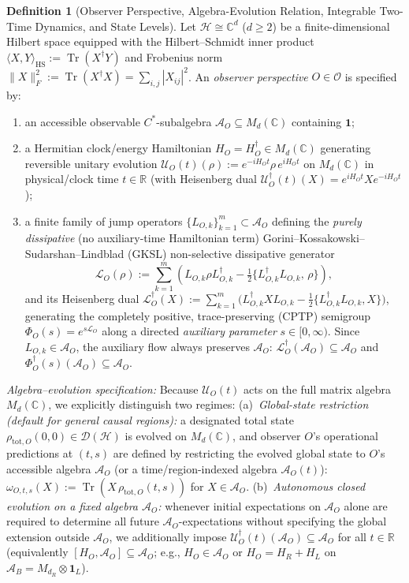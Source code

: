 \documentclass[11pt,a4paper]{article}
\theoremstyle{definition}
\newtheorem{definition}{Definition}
\theoremstyle{remark}
\newcommand{\Tr}{\operatorname{Tr}}
\newcommand{\cH}{\mathcal{H}}
\newcommand{\cA}{\mathcal{A}}
\newcommand{\cD}{\mathcal{D}}
\newcommand{\cL}{\mathcal{L}}
\newcommand{\cU}{\mathcal{U}}
\newcommand{\bbC}{\mathbb{C}}
\newcommand{\bbR}{\mathbb{R}}
\newcommand{\1}{\mathbf{1}}
\newcommand{\normF}[1]{\|#1\|_F}
\begin{document}
\begin{definition}[Observer Perspective, Algebra-Evolution Relation, Integrable Two-Time Dynamics, and State Levels]\label{def:ostqd}
Let $\cH \cong \bbC^d$ ($d \ge 2$) be a finite-dimensional Hilbert space equipped with the Hilbert--Schmidt inner product $\langle X, Y\rangle_{\mathrm{HS}} := \Tr(X^\dagger Y)$ and Frobenius norm $\normF{X}^2 := \Tr(X^\dagger X) = \sum_{i,j}|X_{ij}|^2$. An \emph{observer perspective} $O \in \mathcal{O}$ is specified by:
\begin{enumerate}
  \item an accessible observable $C^*$-subalgebra $\cA_O \subseteq M_d(\bbC)$ containing $\1$;
  \item a Hermitian clock/energy Hamiltonian $H_O = H_O^\dagger \in M_d(\bbC)$ generating reversible unitary evolution $\cU_O(t)(\rho) := e^{-iH_O t}\rho\, e^{iH_O t}$ on $M_d(\bbC)$ in physical/clock time $t \in \bbR$ (with Heisenberg dual $\cU_O^\dagger(t)(X) = e^{iH_O t} X e^{-iH_O t}$);
  \item a finite family of jump operators $\{L_{O,k}\}_{k=1}^m \subset \cA_O$ defining the \emph{purely dissipative} (no auxiliary-time Hamiltonian term) Gorini--Kossakowski--Sudarshan--Lindblad (GKSL) \cite{Lindblad1976,GKS1976} non-selective dissipative generator
  \begin{equation}\label{eq:gksl}
    \cL_O(\rho) := \sum_{k=1}^m \left(L_{O,k}\rho L_{O,k}^\dagger - \tfrac{1}{2}\bigl\{L_{O,k}^\dagger L_{O,k},\,\rho\bigr\}\right),
  \end{equation}
  and its Heisenberg dual $\cL_O^\dagger(X) := \sum_{k=1}^m \bigl(L_{O,k}^\dagger X L_{O,k} - \frac{1}{2}\{L_{O,k}^\dagger L_{O,k}, X\}\bigr)$, generating the completely positive, trace-preserving (CPTP) semigroup $\Phi_O(s) = e^{s\cL_O}$ along a directed \emph{auxiliary parameter} $s \in [0,\infty)$. Since $L_{O,k}\in\cA_O$, the auxiliary flow always preserves $\cA_O$: $\cL_O^\dagger(\cA_O)\subseteq\cA_O$ and $\Phi_O^\dagger(s)(\cA_O)\subseteq\cA_O$.
\end{enumerate}
\emph{Algebra--evolution specification:} Because $\cU_O(t)$ acts on the full matrix algebra $M_d(\bbC)$, we explicitly distinguish two regimes:
(a)~\emph{Global-state restriction (default for general causal regions):} a designated total state $\rho_{\mathrm{tot},O}(0,0)\in\cD(\cH)$ is evolved on $M_d(\bbC)$, and observer $O$'s operational predictions at $(t,s)$ are defined by restricting the evolved global state to $O$'s accessible algebra $\cA_O$ (or a time/region-indexed algebra $\cA_O(t)$): $\omega_{O,t,s}(X) := \Tr(X\,\rho_{\mathrm{tot},O}(t,s))$ for $X\in\cA_O$.
(b)~\emph{Autonomous closed evolution on a fixed algebra $\cA_O$:} whenever initial expectations on $\cA_O$ alone are required to determine all future $\cA_O$-expectations without specifying the global extension outside $\cA_O$, we additionally impose $\cU_O^\dagger(t)(\cA_O)\subseteq\cA_O$ for all $t\in\bbR$ (equivalently $[H_O,\cA_O]\subseteq\cA_O$; e.g., $H_O\in\cA_O$ or $H_O=H_R+H_L$ on $\cA_B = M_{d_R}\otimes\1_L$).


\end{definition}
\end{document}
